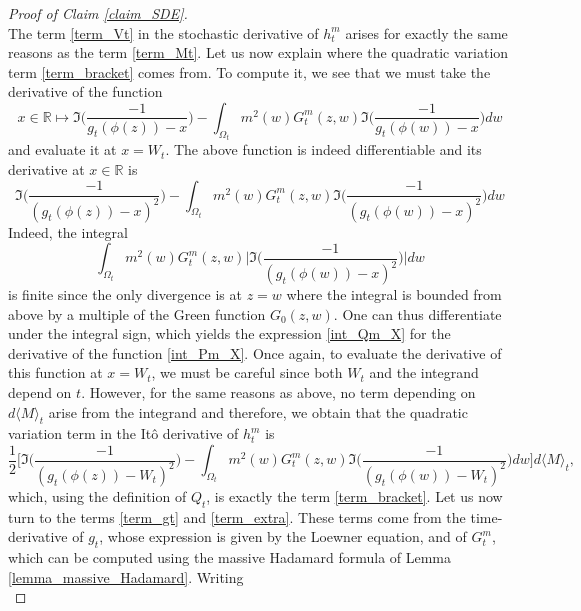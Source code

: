 \documentclass{article}
\theoremstyle{definition}
\theoremstyle{remark}
\theoremstyle{remark}
\begin{document}
\begin{proof}[Proof of Claim \ref{claim_SDE}]
\begin{equation*}
\end{equation*}
The term \eqref{term_Vt} in the stochastic derivative of $h_t^m$ arises for exactly the same reasons as the term \eqref{term_Mt}. Let us now explain where the quadratic variation term \eqref{term_bracket} comes from. To compute it, we see that we must take the derivative of the function
\begin{equation} \label{int_Pm_X}
    x \in \mathbb{R} \mapsto \Im \bigg( \frac{-1}{g_t(\phi(z)) - x} \bigg) - \int_{\Omega_t} m^2(w) G_t^m(z,w) \Im \bigg( \frac{-1}{g_t(\phi(w)) - x} \bigg) dw
\end{equation}
and evaluate it at $x=W_t$. The above function is indeed differentiable and its derivative at $x \in \mathbb{R}$ is
\begin{equation} \label{int_Qm_X}
    \Im \bigg( \frac{-1}{(g_t(\phi(z)) - x)^2} \bigg) - \int_{\Omega_t} m^2(w) G_t^m(z,w) \Im \bigg( \frac{-1}{(g_t(\phi(w)) - x)^2} \bigg) dw
\end{equation}
Indeed, the integral
\begin{equation*}
    \int_{\Omega_t} m^2(w) G_t^m(z,w) \bigg \vert \Im \bigg( \frac{-1}{(g_t(\phi(w)) - x)^2} \bigg) \bigg \vert dw
\end{equation*}
is finite since the only divergence is at $z=w$ where the integral is bounded from above by a multiple of the Green function $G_0(z,w)$. One can thus differentiate under the integral sign, which yields the expression \eqref{int_Qm_X} for the derivative of the function \eqref{int_Pm_X}. Once again, to evaluate the derivative of this function at $x=W_t$, we must be careful since both $W_t$ and the integrand depend on $t$. However, for the same reasons as above, no term depending on $d\langle M \rangle_t$ arise from the integrand and therefore, we obtain that the quadratic variation term in the It\^o derivative of $h_t^m$ is
\begin{equation*}
    \frac{1}{2}\bigg[ \Im \bigg( \frac{-1}{(g_t(\phi(z)) - W_t)^2} \bigg) - \int_{\Omega_t} m^2(w) G_t^m(z,w) \Im \bigg( \frac{-1}{(g_t(\phi(w)) - W_t)^2} \bigg) dw \bigg] d\langle M \rangle_t,
\end{equation*}
which, using the definition of $Q_t$, is exactly the term \eqref{term_bracket}. Let us now turn to the terms \eqref{term_gt} and \eqref{term_extra}. These terms come from the time-derivative of $g_t$, whose expression is given by the Loewner equation, and of $G_t^m$, which can be computed using the massive Hadamard formula of Lemma \ref{lemma_massive_Hadamard}. Writing
\begin{equation*}

\end{equation*}
\end{proof}
\end{document}
